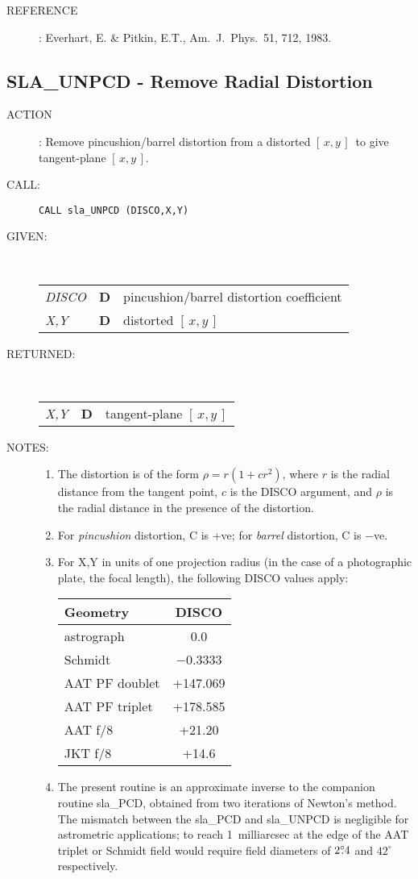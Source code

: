 \documentclass[11pt,twoside]{article}
\newcommand{\xlabel}[1]{}
\newcommand{\xy}        {$[\,x,y\,]$}
\newcommand{\degree}[2] {$#1^{\circ}
                        \hspace{-0.37em}.\hspace{0.02em}#2$}
\newcommand{\routine}[3]
{\hbadness=10000
  \vbox
  {
    \rule{\textwidth}{0.3mm}\\
    {\Large {\bf #1} \hfill #2 \hfill {\bf #1}}\\
    \setlength{\oldspacing}{\topsep}
    \setlength{\topsep}{0.3ex}
    \begin{description}
      #3
    \end{description}
    \setlength{\topsep}{\oldspacing}
  }
}
\renewcommand{\routine}[3]
   {
      \subsection{#1\xlabel{#1} - #2\label{#1}}
       \begin{description}
         #3
       \end{description}
   }
\newcommand{\action}[1]
{\item[ACTION]: #1}
\newcommand{\action}[1]
   {\item[ACTION:] #1}
\newcommand{\call}[1]
{\item[CALL]: \hspace{0.4em}{\tt #1}}
\newlength{\oldspacing}
\renewcommand{\call}[1]
   {
    \item[CALL:] {\tt #1}
   }
\newcommand{\args}[2]
{
  \goodbreak
  \setlength{\oldspacing}{\topsep}
  \setlength{\topsep}{0.3ex}
  \begin{description}
  \item[#1]:\\[1.5ex]
    \begin{tabular}{p{7em}p{6em}p{22em}}
      #2
    \end{tabular}
  \end{description}
  \setlength{\topsep}{\oldspacing}
}
\renewcommand{\args}[2]
   {
     \begin{description}
        \item[#1:]\\
        \begin{tabular}{p{7em}p{6em}l}
           #2
        \end{tabular}
     \end{description}
   }
\newcommand{\spec}[3]
{
  {\em {#1}} & {\bf \mbox{#2}} & {#3}
}
\newcommand{\notes}[1]
{
  \goodbreak
  \setlength{\oldspacing}{\topsep}
  \setlength{\topsep}{0.3ex}
  \begin{description}
    \item[NOTES]:
        #1
  \end{description}
  \setlength{\topsep}{\oldspacing}
}
\renewcommand{\notes}[1]
   {
      \begin{description}
         \item[NOTES:]
            #1
      \end{description}
   }
\newcommand{\aref}[1]
{
  \goodbreak
  \setlength{\oldspacing}{\topsep}
  \setlength{\topsep}{0.3ex}
  \begin{description}
    \item[REFERENCE]:
        #1
  \end{description}
  \setlength{\topsep}{\oldspacing}
}
\newcommand{\aref}[1]
   {
     \begin{description}
       \item[REFERENCE:]
           #1
     \end{description}
   }
\begin{document}
\aref{Everhart, E. \& Pitkin, E.T., Am.~J.~Phys.~51, 712, 1983.}
\routine{SLA\_UNPCD}{Remove Radial Distortion}
{
 \action{Remove pincushion/barrel distortion from a distorted 
         \xy\  to give tangent-plane \xy.}
 \call{CALL sla\_UNPCD (DISCO,X,Y)}
}
\args{GIVEN}
{
 \spec{DISCO}{D}{pincushion/barrel distortion coefficient} \\
 \spec{X,Y}{D}{distorted \xy}
}
\args{RETURNED}
{
 \spec{X,Y}{D}{tangent-plane \xy}
}
\notes
{
 \begin{enumerate}
  \item The distortion is of the form $\rho = r (1 + c r^{2})$, where $r$ is
        the radial distance from the tangent point, $c$ is the DISCO
        argument, and $\rho$ is the radial distance in the presence of
        the distortion.
  \item For {\it pincushion}\/ distortion, C is +ve;  for
        {\it barrel}\/ distortion, C is $-$ve.
  \item For X,Y in units of one projection radius (in the case of
        a photographic plate, the focal length), the following
        DISCO values apply:

        \vspace{2ex}

        \hspace{5em}
        \begin{tabular}{|l|c|} \hline
         Geometry & DISCO \\ \hline \hline
         astrograph & 0.0 \\ \hline
         Schmidt & $-$0.3333 \\ \hline
         AAT PF doublet & +147.069 \\ \hline
         AAT PF triplet & +178.585 \\ \hline
         AAT f/8 & +21.20 \\ \hline
         JKT f/8 & +14.6 \\ \hline
        \end{tabular}

        \vspace{2ex}

  \item The present routine is an approximate inverse to the
        companion routine sla\_PCD, obtained from two iterations
        of Newton's method.  The mismatch between the sla\_PCD
        and sla\_UNPCD is negligible for astrometric applications;
        to reach 1~milliarcsec at the edge of the AAT triplet or
        Schmidt field would require field diameters of \degree{2}{4}
        and $42^{\circ}$ respectively.
 \end{enumerate}
}
\end{document}
